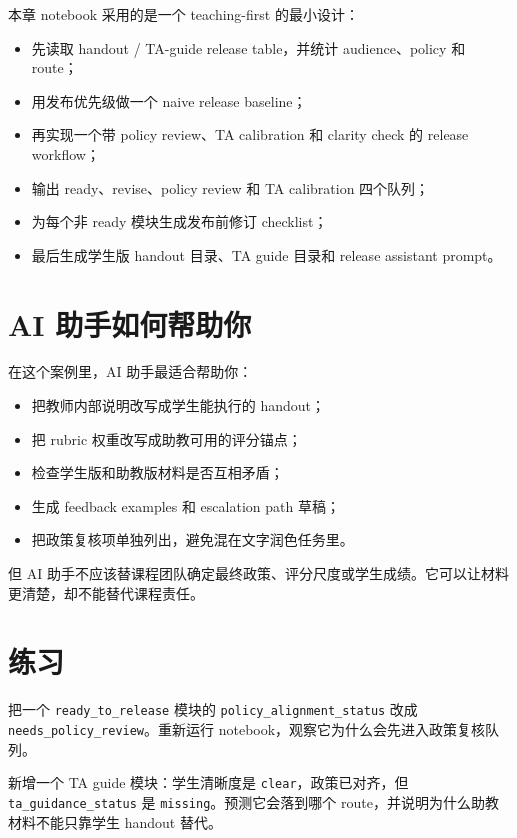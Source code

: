 本章 notebook 采用的是一个 teaching-first 的最小设计：

\begin{itemize}
    \item 先读取 handout / TA-guide release table，并统计 audience、policy 和 route；
    \item 用发布优先级做一个 naive release baseline；
    \item 再实现一个带 policy review、TA calibration 和 clarity check 的 release workflow；
    \item 输出 ready、revise、policy review 和 TA calibration 四个队列；
    \item 为每个非 ready 模块生成发布前修订 checklist；
    \item 最后生成学生版 handout 目录、TA guide 目录和 release assistant prompt。
\end{itemize}

\section{AI 助手如何帮助你}

在这个案例里，AI 助手最适合帮助你：

\begin{itemize}
    \item 把教师内部说明改写成学生能执行的 handout；
    \item 把 rubric 权重改写成助教可用的评分锚点；
    \item 检查学生版和助教版材料是否互相矛盾；
    \item 生成 feedback examples 和 escalation path 草稿；
    \item 把政策复核项单独列出，避免混在文字润色任务里。
\end{itemize}

但 AI 助手不应该替课程团队确定最终政策、评分尺度或学生成绩。它可以让材料更清楚，却不能替代课程责任。

\section{练习}

\begin{exercisebox}[基础练习]
把一个 \texttt{ready\_to\_release} 模块的 \texttt{policy\_alignment\_status} 改成 \texttt{needs\_policy\_review}。重新运行 notebook，观察它为什么会先进入政策复核队列。
\end{exercisebox}

\begin{exercisebox}[进阶练习]
新增一个 TA guide 模块：学生清晰度是 \texttt{clear}，政策已对齐，但 \texttt{ta\_guidance\_status} 是 \texttt{missing}。预测它会落到哪个 route，并说明为什么助教材料不能只靠学生 handout 替代。
\end{exercisebox}

